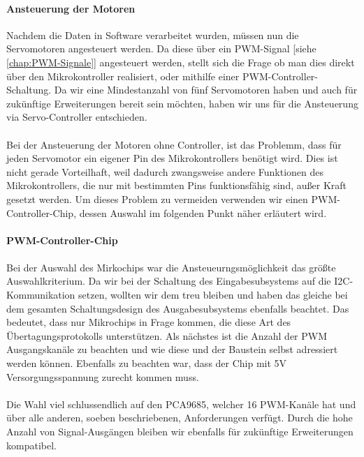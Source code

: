 \documentclass[titlepage,12pt,twoside]{article}
\begin{document}
\paragraph{Ansteuerung der Motoren}
\label{par:Ansteuerung der Motoren}
\hfill \break
\hfill \break
Nachdem die Daten in Software verarbeitet wurden, müssen nun die Servomotoren angesteuert werden. Da diese über ein PWM-Signal [siehe \textcolor{blue}{\autoref{chap:PWM-Signale}}]
angesteuert werden, stellt sich die Frage ob man dies direkt über den Mikrokontroller realisiert, oder mithilfe einer PWM-Controller-Schaltung.
Da wir eine Mindestanzahl von fünf Servomotoren haben und auch für zukünftige Erweiterungen bereit sein möchten, haben wir uns für die Ansteuerung
via Servo-Controller entschieden. \\
\\
Bei der Ansteuerung der Motoren ohne Controller, ist das Problemm, dass für jeden Servomotor ein eigener Pin des Mikrokontrollers benötigt wird.
Dies ist nicht gerade Vorteilhaft, weil dadurch zwangsweise andere Funktionen des Mikrokontrollers, die nur mit bestimmten Pins funktionsfähig sind,
außer Kraft gesetzt werden. Um dieses Problem zu vermeiden verwenden wir einen PWM-Controller-Chip, dessen Auswahl im folgenden Punkt näher erläutert wird. \\
\\
\textbf{PWM-Controller-Chip} \\
\\
Bei der Auswahl des Mirkochips war die Ansteueurngsmöglichkeit das größte Auswahlkriterium. Da wir bei der Schaltung des Eingabesubsystems
auf die I2C-Kommunikation setzen, wollten wir dem treu bleiben und haben das gleiche bei dem gesamten Schaltungsdesign des Ausgabesubsystems
ebenfalls beachtet. Das bedeutet, dass nur Mikrochips in Frage kommen, die diese Art des Übertagungsprotokolls unterstützen. Als nächstes
ist die Anzahl der PWM Ausgangskanäle zu beachten und wie diese und der Baustein selbst adressiert werden können. Ebenfalls zu beachten war,
dass der Chip mit 5V Versorgungsspannung zurecht kommen muss. \\
\\
Die Wahl viel schlussendlich auf den PCA9685, welcher 16 PWM-Kanäle hat und über alle anderen, soeben beschriebenen, Anforderungen verfügt.
Durch die hohe Anzahl von Signal-Ausgängen bleiben wir ebenfalls für zukünftige Erweiterungen kompatibel. \\
\\
\end{document}

